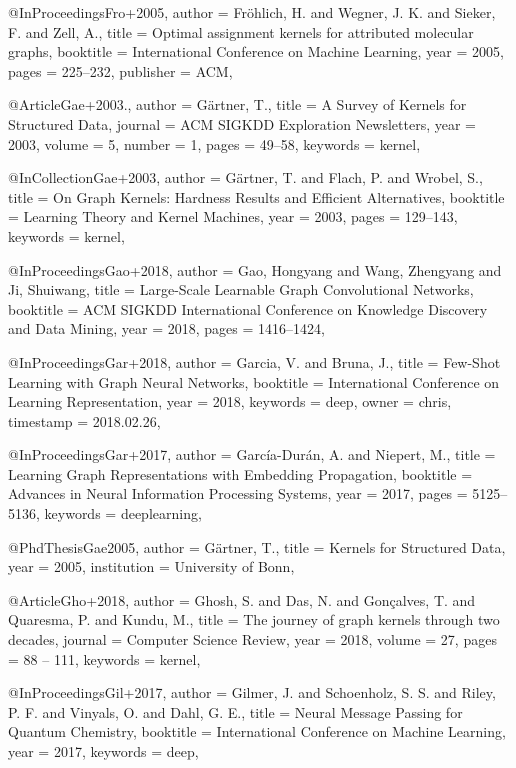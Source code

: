 @InProceedings{Fro+2005,
  author    = {Fr\"{o}hlich, H. and Wegner, J. K. and Sieker, F. and Zell, A.},
  title     = {Optimal assignment kernels for attributed molecular graphs},
  booktitle = {International Conference on Machine Learning},
  year      = {2005},
  pages     = {225--232},
  publisher = {ACM},
}

@Article{Gae+2003.,
  author   = {G\"{a}rtner, T.},
  title    = {A Survey of Kernels for Structured Data},
  journal  = {ACM SIGKDD Exploration Newsletters},
  year     = {2003},
  volume   = {5},
  number   = {1},
  pages    = {49--58},
  keywords = {kernel},
}

@InCollection{Gae+2003,
  author    = {G\"{a}rtner, T. and Flach, P. and Wrobel, S.},
  title     = {On Graph Kernels: Hardness Results and Efficient Alternatives},
  booktitle = {Learning Theory and Kernel Machines},
  year      = {2003},
  pages     = {129--143},
  keywords  = {kernel},
}

@InProceedings{Gao+2018,
  author    = {Gao, Hongyang and Wang, Zhengyang and Ji, Shuiwang},
  title     = {Large-Scale Learnable Graph Convolutional Networks},
  booktitle = {ACM SIGKDD International Conference on Knowledge Discovery and Data Mining},
  year      = {2018},
  pages     = {1416--1424},
}

@InProceedings{Gar+2018,
  author    = {Garcia, V. and Bruna, J.},
  title     = {Few-Shot Learning with Graph Neural Networks},
  booktitle = {International Conference on Learning Representation},
  year      = {2018},
  keywords  = {deep},
  owner     = {chris},
  timestamp = {2018.02.26},
}

@InProceedings{Gar+2017,
  author    = {García{-}Dur{\'{a}}n, A. and Niepert, M.},
  title     = {Learning Graph Representations with Embedding Propagation},
  booktitle = {Advances in Neural Information Processing Systems},
  year      = {2017},
  pages     = {5125--5136},
  keywords  = {deeplearning},
}

@PhdThesis{Gae2005,
  author      = {Gärtner, T.},
  title       = {Kernels for Structured Data},
  year        = {2005},
  institution = {University of Bonn},
}

@Article{Gho+2018,
  author   = {Ghosh, S. and Das, N. and Gonçalves, T. and Quaresma, P. and Kundu, M.},
  title    = {The journey of graph kernels through two decades},
  journal  = {Computer Science Review},
  year     = {2018},
  volume   = {27},
  pages    = {88 -- 111},
  keywords = {kernel},
}

@InProceedings{Gil+2017,
  author    = {Gilmer, J. and Schoenholz, S. S. and Riley, P. F. and Vinyals, O. and Dahl, G. E.},
  title     = {Neural Message Passing for Quantum Chemistry},
  booktitle = {International Conference on Machine Learning},
  year      = {2017},
  keywords  = {deep},
}

